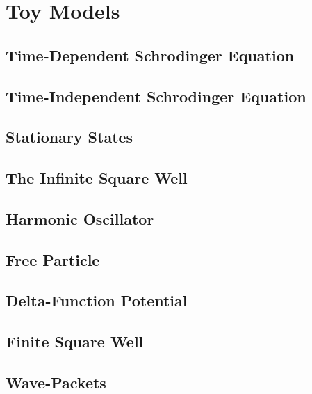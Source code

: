 \chapter{Toy Models}
\section{Time-Dependent Schrodinger Equation}
\section{Time-Independent Schrodinger Equation}
\section{Stationary States}
\section{The Infinite Square Well}
\section{Harmonic Oscillator}
\section{Free Particle}
\section{Delta-Function Potential}
\section{Finite Square Well}
\section{Wave-Packets}